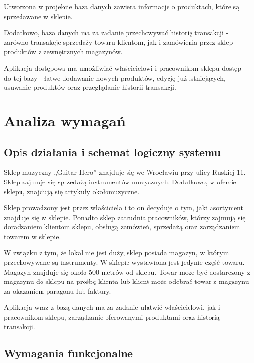 Utworzona w projekcie baza danych zawiera informacje o produktach, które są sprzedawane w sklepie.

Dodatkowo, baza danych ma za zadanie przechowywać historię transakcji - zarówno transakcje sprzedaży towaru klientom, jak i zamówienia przez sklep produktów z zewnętrznych magazynów.

Aplikacja dostępowa ma umożliwiać właścicielowi i pracownikom sklepu dostęp do tej bazy - łatwe dodawanie nowych produktów, edycję już istniejących, usuwanie produktów oraz przeglądanie historii transakcji.

\section{Analiza wymagań} \label{analiza_wymagan}
\subsection{Opis działania i schemat logiczny systemu}

Sklep muzyczny „Guitar Hero” znajduje się we Wrocławiu przy ulicy Ruskiej 11. Sklep zajmuje się sprzedażą instrumentów muzycznych. Dodatkowo, w ofercie sklepu, znajdują się artykuły okołomuzyczne.

Sklep prowadzony jest przez właściciela i to on decyduje o tym, jaki asortyment znajduje się w sklepie. Ponadto sklep zatrudnia pracowników, którzy zajmują się doradzaniem klientom sklepu, obsługą zamówień, sprzedażą oraz zarządzaniem towarem w sklepie.

W związku z tym, że lokal nie jest duży, sklep posiada magazyn, w którym przechowywane są instrumenty. W sklepie wystawiona jest jedynie część towaru. Magazyn znajduje się około 500 metrów od sklepu. Towar może być dostarczony z magazynu do sklepu na prośbę klienta lub klient może odebrać towar z magazynu za okazaniem paragonu lub faktury.

Aplikacja wraz z bazą danych ma za zadanie ułatwić właścicielowi, jak i pracownikom sklepu, zarządzanie oferowanymi produktami oraz historią transakcji.

\subsection{Wymagania funkcjonalne}

